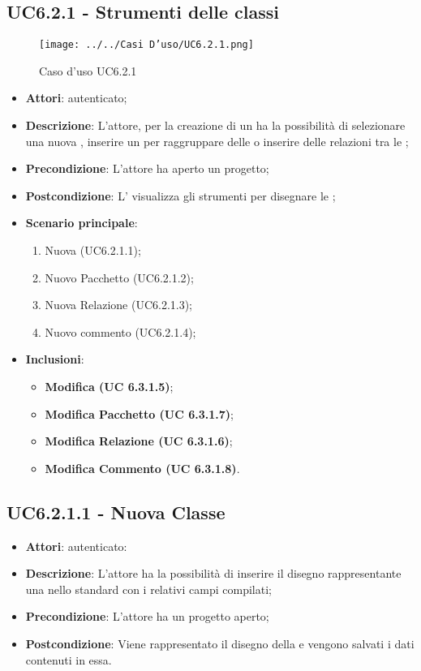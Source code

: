 \subsection{UC6.2.1 - Strumenti delle classi}
\label{ssec:UC6.2.1}
\begin{figure}[h!]
\centering
\texttt{[image: ../../Casi D'uso/UC6.2.1.png]}
\caption{Caso d'uso UC6.2.1}
 \end{figure}
\begin{itemize}
\item \textbf{Attori}:  autenticato;
\item \textbf{Descrizione}: L'attore, per la creazione di un  ha la possibilità di selezionare una nuova , inserire un  per raggruppare delle  o inserire delle relazioni tra le ;
\item \textbf{Precondizione}: L'attore ha aperto un progetto;
\item \textbf{Postcondizione}: L' visualizza gli strumenti per disegnare le ;
\item \textbf{Scenario principale}: \begin{enumerate}\item Nuova  (UC6.2.1.1);\item Nuovo Pacchetto (UC6.2.1.2);\item Nuova Relazione (UC6.2.1.3);\item Nuovo commento (UC6.2.1.4);
 \end{enumerate}
 \item \textbf{Inclusioni}: \begin{itemize}
 	\item \textbf{ Modifica  (UC 6.3.1.5)};
 	\item \textbf{ Modifica Pacchetto (UC 6.3.1.7)};
 	\item \textbf{ Modifica Relazione (UC 6.3.1.6)};
 	\item \textbf{ Modifica Commento (UC 6.3.1.8)}.
 \end{itemize}
\end{itemize}
\subsection{UC6.2.1.1 - Nuova Classe}
\label{ssec:UC6.2.1.1}
\begin{itemize}
\item \textbf{Attori}:  autenticato:
\item \textbf{Descrizione}: L'attore ha la possibilità di inserire il disegno rappresentante una  nello standard  con i relativi campi compilati;
\item \textbf{Precondizione}: L'attore ha un progetto aperto;
\item \textbf{Postcondizione}: Viene rappresentato il disegno della  e vengono salvati i dati contenuti in essa.
\end{itemize}
